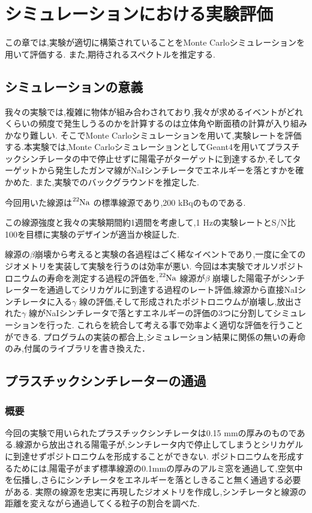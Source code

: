 \chapter{シミュレーションにおける実験評価}\label{simulation}

この章では,実験が適切に構築されていることをMonte Carloシミュレーションを用いて評価する.
また,期待されるスペクトルを推定する.

\section{シミュレーションの意義}

我々の実験では,複雑に物体が組み合わされており,我々が求めるイベントがどれくらいの頻度で発生しうるのかを計算するのは立体角や断面積の計算が入り組みかなり難しい.
そこでMonte Carloシミュレーションを用いて,実験レートを評価する.本実験では,Monte CarloシミュレーションとしてGeant4を用いてプラスチックシンチレータの中で停止せずに陽電子がターゲットに到達するか,そしてターゲットから発生したガンマ線がNaIシンチレータでエネルギーを落とすかを確かめた.
また,実験でのバックグラウンドを推定した.

今回用いた線源は$\ce{^{22}Na}$ の標準線源であり,200 kBqのものである.

この線源強度と我々の実験期間約1週間を考慮して,1 Hzの実験レートとS/N比100を目標に実験のデザインが適当か検証した.

線源の$\beta$崩壊から考えると実験の各過程はごく稀なイベントであり,一度に全てのジオメトリを実装して実験を行うのは効率が悪い.
今回は本実験でオルソポジトロニウムの寿命を測定する過程の評価を,$\ce{^{22}Na}$ 線源が$\beta$ 崩壊した陽電子がシンチレーターを通過してシリカゲルに到達する過程のレート評価,線源から直接NaIシンチレータに入る$\gamma$ 線の評価,そして形成されたポジトロニウムが崩壊し,放出された$\gamma$ 線がNaIシンチレータで落とすエネルギーの評価の3つに分割してシミュレーションを行った.
これらを統合して考える事で効率よく適切な評価を行うことができる.
プログラムの実装の都合上,シミュレーション結果に関係の無いの寿命のみ,付属のライブラリを書き換えた．

\section{プラスチックシンチレーターの通過}
\label{plastic_scintillator_effect}

\subsection{概要}
今回の実験で用いられたプラスチックシンチレータは0.15 mmの厚みのものである.線源から放出される陽電子が,シンチレータ内で停止してしまうとシリカゲルに到達せずポジトロニウムを形成することができない.
ポジトロニウムを形成するためには,陽電子がまず標準線源の0.1mmの厚みのアルミ窓を通過して,空気中を伝播し,さらにシンチレータをエネルギーを落としきること無く通過する必要がある.
実際の線源を忠実に再現したジオメトリを作成し,シンチレータと線源の距離を変えながら通過してくる粒子の割合を調べた.

